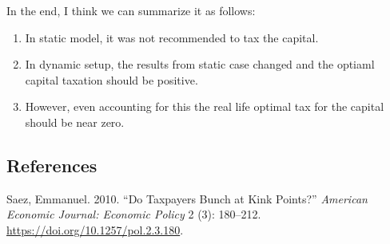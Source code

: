 \documentclass[
  letterpaper,
  DIV=11,
  numbers=noendperiod]{scrartcl}
\newlength{\cslhangindent}
\newenvironment{CSLReferences}[2] %
 {\begin{list}{}{%
  \setlength{\itemindent}{0pt}
  \setlength{\leftmargin}{0pt}
  \setlength{\parsep}{0pt}
  \ifodd #1
   \setlength{\leftmargin}{\cslhangindent}
   \setlength{\itemindent}{-1\cslhangindent}
  \fi
  \setlength{\itemsep}{#2\baselineskip}}}
 {\end{list}}
\begin{document}
In the end, I think we can summarize it as follows:

\begin{enumerate}
\def\labelenumi{\arabic{enumi}.}
\item
  In static model, it was not recommended to tax the capital.
\item
  In dynamic setup, the results from static case changed and the optiaml
  capital taxation should be positive.
\item
  However, even accounting for this the real life optimal tax for the
  capital should be near zero.
\end{enumerate}

\subsection*{References}\label{references}

\label{refs}
\begin{CSLReferences}{1}{0}
Saez, Emmanuel. 2010. {``Do Taxpayers Bunch at Kink Points?''}
\emph{American Economic Journal: Economic Policy} 2 (3): 180--212.
\url{https://doi.org/10.1257/pol.2.3.180}.

\end{CSLReferences}
\end{document}

